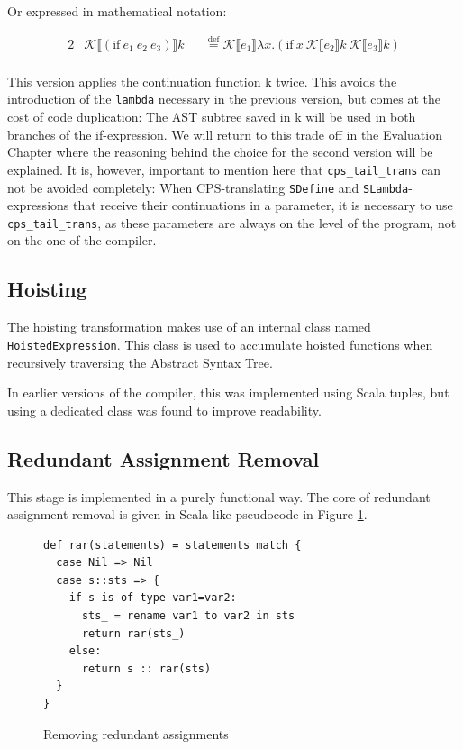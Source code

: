 \documentclass[11pt]{report}
\newcommand{\eqdef}{\stackrel{\text{def}}{=}}%
\newcommand{\cpstrans}[1]{\ensuremath{\mathcal{K}\llbracket #1 \rrbracket}}
\begin{document}
Or expressed in mathematical notation:

\begin{alignat*}{2}
&\cpstrans{(\text{if}\ e_1\ e_2\ e_3)} k &&\eqdef \cpstrans{e_1} \lambda x.(\text{if}\ x\ \cpstrans{e_2}k\ \cpstrans{e_3}k) \\
\end{alignat*}

This version applies the continuation function k twice. This avoids the introduction of the \texttt{lambda} necessary in the previous version, but comes at the cost of code duplication: The AST subtree saved in k will be used in both branches of the if-expression. We will return to this trade off in the Evaluation Chapter where the reasoning behind the choice for the second version will be explained. It is, however, important to mention here that \texttt{cps_tail_trans} can not be avoided completely: When CPS-translating \texttt{SDefine} and \texttt{SLambda}-expressions that receive their continuations in a parameter, it is necessary to use \texttt{cps_tail_trans}, as these parameters are always on the level of the program, not on the one of the compiler.


\subsection{Hoisting}
The hoisting transformation makes use of an internal class named \texttt{HoistedExpression}. This class is used to accumulate hoisted functions when recursively traversing the Abstract Syntax Tree.

In earlier versions of the compiler, this was implemented using Scala tuples, but using a dedicated class was found to improve readability. 


\subsection{Redundant Assignment Removal}
This stage is implemented in a purely functional way. The core of redundant assignment removal is given in Scala-like pseudocode in Figure \ref{remredasign1}.

\begin{figure}[ht]
\begin{lstlisting}
def rar(statements) = statements match {
  case Nil => Nil
  case s::sts => {
    if s is of type var1=var2:
      sts_ = rename var1 to var2 in sts
      return rar(sts_)
    else:
      return s :: rar(sts)
  }
}
\end{lstlisting}
\caption{Removing redundant assignments}
\label{remredasign1}
\end{figure}
\end{document}
